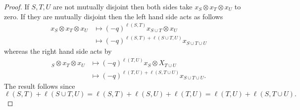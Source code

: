\documentclass[11pt]{amsart}
\begin{document}
\begin{proof}
If $S,T,U$ are not mutually disjoint then both sides take $x_S \otimes x_T \otimes x_U$ to zero. If they are mutually disjoint then the left hand side acts as follows
\begin{align*}
x_S \otimes x_T \otimes x_U 
&\mapsto (-q)^{\ell(S,T)} x_{S \cup T} \otimes x_U \\
&\mapsto (-q)^{\ell(S,T) + \ell(S \cup T,U)} x_{S \cup T \cup U}
\end{align*}
whereas the right hand side acts by
\begin{align*}
_S \otimes x_T \otimes x_U 
&\mapsto (-q)^{\ell(T,U)} x_S \otimes X_{T \cup U} \\
&\mapsto (-q)^{\ell(T,U)+\ell(S,T \cup U)} x_{S \cup T \cup U}.
\end{align*}
The result follows since 
$$\ell(S,T) + \ell(S \cup T,U) = \ell(S,T) + \ell(S,U) + \ell(T,U) = \ell(T,U)+\ell(S,T \cup U).$$


\end{proof}
\end{document}
